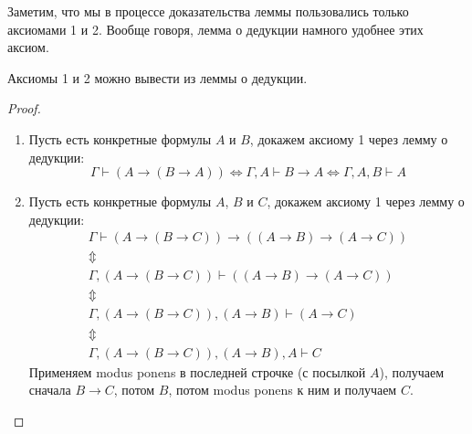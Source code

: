 Заметим, что мы в процессе доказательства леммы пользовались только аксиомами 1 и 2.
Вообще говоря, лемма о дедукции намного удобнее этих аксиом.
\begin{exmp}
	Аксиомы 1 и 2 можно вывести из леммы о дедукции.
\end{exmp}
\begin{proof}
	\begin{enumerate}
		\item
			Пусть есть конкретные формулы $A$ и $B$, докажем аксиому 1 через лемму о дедукции:
			\[ \Gamma \vdash (A \to (B \to A)) \iff \Gamma, A \vdash B \to A \iff \Gamma, A, B \vdash A\]
		\item
			Пусть есть конкретные формулы $A$, $B$ и $C$, докажем аксиому 1 через лемму о дедукции:
			\begin{gather*}
				\Gamma \vdash (A \to (B \to C)) \to ((A \to B) \to (A \to C)) \\
				\Updownarrow \\
				\Gamma, (A \to (B \to C)) \vdash ((A \to B) \to (A \to C)) \\
				\Updownarrow \\
				\Gamma, (A \to (B \to C)), (A \to B) \vdash (A \to C) \\
				\Updownarrow \\
				\Gamma, (A \to (B \to C)), (A \to B), A \vdash C
			\end{gather*}
			Применяем modus ponens в последней строчке (с посылкой $A$), получаем сначала $B \to C$, потом $B$, потом modus ponens к ним и получаем $C$.
	\end{enumerate}
\end{proof}

